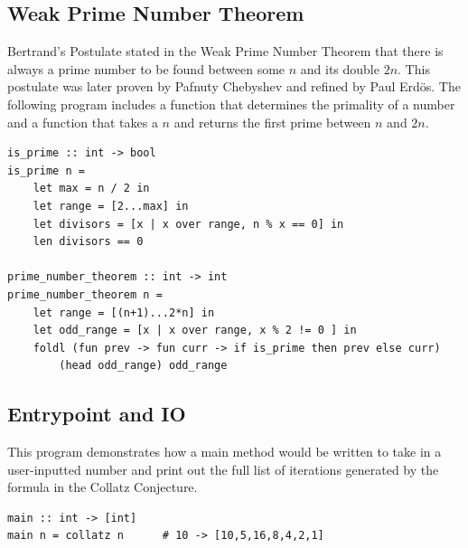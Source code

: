 \documentclass[5pt]{article}
\begin{document}
\subsection{Weak Prime Number Theorem}
Bertrand's Postulate stated in the Weak Prime Number Theorem that there is 
always a prime number to be found between some $n$ and its double $2n$. This 
postulate was later proven by Pafnuty Chebyshev and refined by Paul Erd\"{o}s. 
The following program includes a function that determines the primality of a 
number and a function that takes a $n$ and returns the first prime between 
$n$ and $2n$.
\begin{lstlisting}[language=rippl]
is_prime :: int -> bool
is_prime n =
    let max = n / 2 in
    let range = [2...max] in
    let divisors = [x | x over range, n % x == 0] in
    len divisors == 0
    
prime_number_theorem :: int -> int
prime_number_theorem n =
    let range = [(n+1)...2*n] in
    let odd_range = [x | x over range, x % 2 != 0 ] in
    foldl (fun prev -> fun curr -> if is_prime then prev else curr)
        (head odd_range) odd_range
\end{lstlisting}
\subsection{Entrypoint and IO}
This program demonstrates how a main method would be written to take in a user-inputted number and print out the full list of iterations generated by the formula in the Collatz Conjecture.
\begin{lstlisting}[language=rippl]
main :: int -> [int]
main n = collatz n      # 10 -> [10,5,16,8,4,2,1]
\end{lstlisting}
\end{document}
